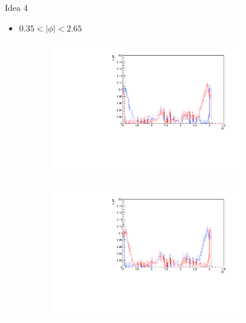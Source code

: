 \documentclass[11pt]{beamer}
\begin{document}
\begin{frame}{Idea 4}
\begin{itemize}
\item $0.35 < |\phi| < 2.65$
\end{itemize}
\begin{figure}
\begin{subfigure}{0.45\textwidth}
\includegraphics[width=0.9\textwidth]{first/up_pdf/test_u/h_phi_test_SPi_combined.pdf}
\end{subfigure}
\begin{subfigure}{0.45\textwidth}
\includegraphics[width=0.9\textwidth]{first/down_pdf/test_d/h_phi_test_SPi_combined.pdf}
\end{subfigure}
\end{figure}
\end{frame}
\end{document}
